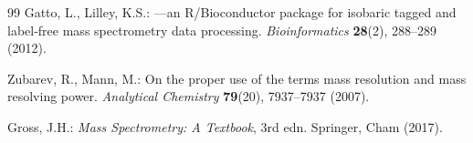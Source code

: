 \documentclass[11pt,twoside,openright]{book}
\begin{document}
\begin{thebibliography}{99}
Gatto, L., Lilley, K.S.:
---an {R/Bioconductor} package for isobaric tagged and label-free mass spectrometry data processing.
\newblock \emph{Bioinformatics} \textbf{28}(2), 288--289 (2012).
\newblock {}

Zubarev, R., Mann, M.:
\newblock On the proper use of the terms mass resolution and mass resolving power.
\newblock \emph{Analytical Chemistry} \textbf{79}(20), 7937--7937 (2007).
\newblock {}

Gross, J.H.:
\newblock \emph{Mass Spectrometry: A Textbook}, 3rd edn.
\newblock Springer, Cham (2017).
\newblock {}

\end{thebibliography}
\end{document}

